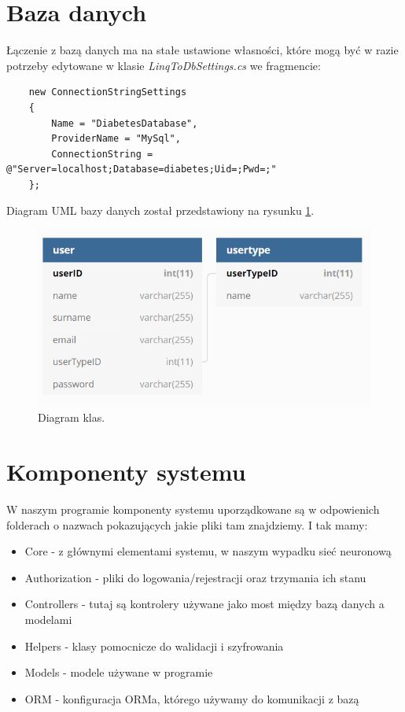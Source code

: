 \documentclass[12pt,a4paper]{article}
\begin{document}
\section*{Baza danych}
Łączenie z bazą danych ma na stałe ustawione własności, które mogą być w razie potrzeby edytowane w klasie \emph{LinqToDbSettings.cs} we fragmencie:
	\begin{lstlisting}
	new ConnectionStringSettings
	{
		Name = "DiabetesDatabase",
		ProviderName = "MySql",
		ConnectionString = @"Server=localhost;Database=diabetes;Uid=;Pwd=;"
	};
	\end{lstlisting}


Diagram UML bazy danych został przedstawiony na rysunku \ref{fig:dbdiagram}.


\begin{figure}[h]
	\centering
	\centerline{
	\includegraphics[width=0.9\linewidth]{media/dbdiagram}
	}
	\caption{Diagram klas.}
	\label{fig:dbdiagram}
\end{figure}



\section*{Komponenty systemu}
W naszym programie komponenty systemu uporządkowane są w odpowienich folderach o nazwach pokazujących jakie pliki tam znajdziemy. I tak mamy:\\
\begin{itemize}
\item Core - z głównymi elementami systemu, w naszym wypadku sieć neuronową\\
\item Authorization - pliki do logowania/rejestracji oraz trzymania ich stanu\\
\item Controllers - tutaj są kontrolery używane jako most między bazą danych a modelami\\
\item Helpers - klasy pomocnicze do walidacji i szyfrowania\\
\item Models - modele używane w programie\\
\item ORM - konfiguracja ORMa, którego używamy do komunikacji z bazą\\
\end{itemize}
\end{document}
